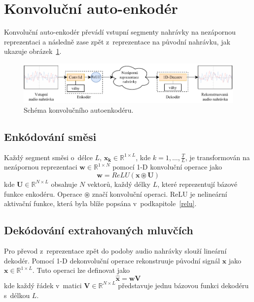 \section{Konvoluční auto-enkodér}
Konvoluční auto-enkodér převádí vstupní segmenty nahrávky na nezápornou reprezentaci a následně zase zpět z~reprezentace na původní nahrávku, jak ukazuje obrázek~\ref{fig:tasnet-autoenkoder}.
\begin{figure}[H]
    \centering
    \includegraphics[scale=0.9]{obrazky-figures/autoenkoder.pdf}
    \caption{\label{fig:tasnet-autoenkoder}Schéma konvolučního autoenkodéru.}
\end{figure}


\subsection{Enkódování směsi}
Každý segment směsi o~délce $L$, $\boldsymbol{x_k} \in \mathbb{R}^{1 \times L}$, kde $k = 1, \dots, \frac{T}{L}$, je transformován na nezápornou reprezentaci $\boldsymbol{w} \in \mathbb{R}^{1 \times N}$ pomocí 1-D konvoluční operace jako
\begin{equation}
  	\boldsymbol{w} = ReLU(\boldsymbol{x} \circledast \boldsymbol{U})
\end{equation}
kde $\boldsymbol{U} \in \mathbb{R}^{N \times L}$ obsahuje $N$ vektorů, každý délky $L$, které reprezentují bázové funkce enkodéru. Operace $\circledast$ značí konvoluční operaci. ReLU je nelineární aktivační funkce, která byla blíže popsána v~podkapitole~\ref{relu}.


\subsection{Dekódování extrahovaných mluvčích}
Pro převod z~reprezentace zpět do podoby audio nahrávky slouží lineární dekodér. Pomocí 1-D dekonvoluční operace rekonstruuje původní signál $\boldsymbol{x}$ jako $\boldsymbol{x} \in \mathbb{R}^{1 \times L}$. Tuto operaci lze definovat jako 
\begin{equation}
\label{equ:decoder}
  \boldsymbol{\hat{x}} = \boldsymbol{w}\boldsymbol{V}
\end{equation}
kde každý řádek v~matici $\boldsymbol{V} \in \mathbb{R}^{N \times L}$ představuje jednu bázovou funkci dekodéru s~délkou $L$.

